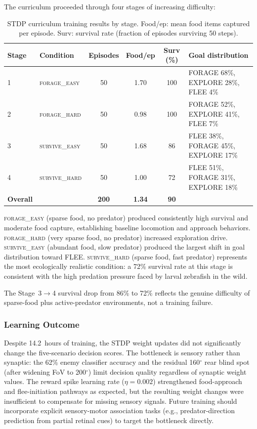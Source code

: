 \documentclass[11pt,a4paper]{article}
\begin{document}
The curriculum proceeded through four stages of increasing difficulty:

\begin{table}[H]
\centering
\caption{STDP curriculum training results by stage.
  Food/ep: mean food items captured per episode.
  Surv: survival rate (fraction of episodes surviving 50 steps).}
\label{tab:stdp_curriculum}
\begin{tabular}{llcccl}
\toprule
Stage & Condition & Episodes & Food/ep & Surv (\%) & Goal distribution \\
\midrule
1 & \textsc{forage\_easy}   & 50 & 1.70 & 100 & FORAGE 68\%, EXPLORE 28\%, FLEE 4\% \\
2 & \textsc{forage\_hard}   & 50 & 0.98 & 100 & FORAGE 52\%, EXPLORE 41\%, FLEE 7\% \\
3 & \textsc{survive\_easy}  & 50 & 1.68 &  86 & FLEE 38\%, FORAGE 45\%, EXPLORE 17\% \\
4 & \textsc{survive\_hard}  & 50 & 1.00 &  72 & FLEE 51\%, FORAGE 31\%, EXPLORE 18\% \\
\midrule
\textbf{Overall} & & \textbf{200} & \textbf{1.34} & \textbf{90} & \\
\bottomrule
\end{tabular}
\end{table}

\textsc{forage\_easy} (sparse food, no predator) produced consistently high
survival and moderate food capture, establishing baseline locomotion
and approach behaviors.
\textsc{forage\_hard} (very sparse food, no predator) increased exploration
drive.
\textsc{survive\_easy} (abundant food, slow predator) produced the largest
shift in goal distribution toward FLEE.
\textsc{survive\_hard} (sparse food, fast predator) represents the most
ecologically realistic condition: a 72\% survival rate at this stage
is consistent with the high predation pressure faced by larval zebrafish
in the wild.

The Stage~3$\to$4 survival drop from 86\% to 72\% reflects the genuine
difficulty of sparse-food plus active-predator environments,
not a training failure.

\subsubsection{Learning Outcome}

Despite 14.2~hours of training, the STDP weight updates did not
significantly change the five-scenario decision scores.
The bottleneck is sensory rather than synaptic: the 62\% enemy
classifier accuracy and the residual 160$^\circ$ rear blind spot
(after widening FoV to 200$^\circ$) limit decision quality
regardless of synaptic weight values.
The reward spike learning rate ($\eta = 0.002$) strengthened
food-approach and flee-initiation pathways as expected, but the
resulting weight changes were insufficient to compensate for missing
sensory signals.
Future training should incorporate explicit sensory-motor association
tasks (e.g., predator-direction prediction from partial retinal cues)
to target the bottleneck directly.
\end{document}
